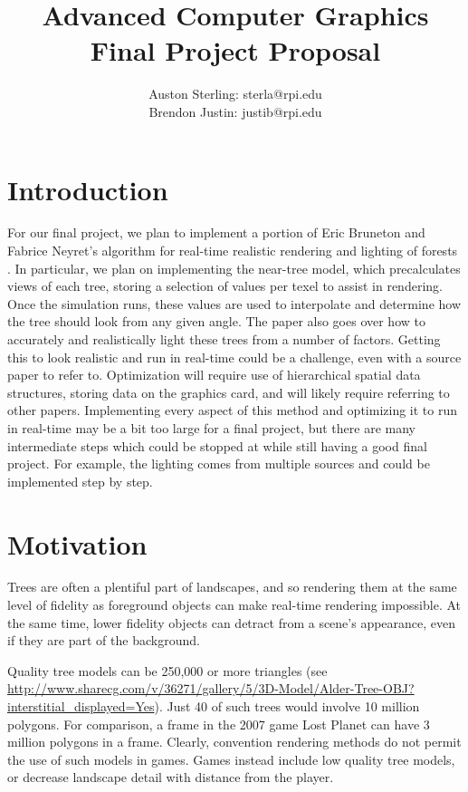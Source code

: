 \documentclass{article}
\begin{document}
\title{Advanced Computer Graphics Final Project Proposal}
\author{Auston Sterling: sterla@rpi.edu \\ Brendon Justin: justib@rpi.edu}
\date{}
\maketitle

\section{Introduction}
For our final project, we plan to implement a portion of Eric Bruneton and Fabrice Neyret's algorithm for real-time realistic rendering and lighting of forests \cite{trees}. In particular, we plan on implementing the near-tree model, which precalculates views of each tree, storing a selection of values per texel to assist in rendering. Once the simulation runs, these values are used to interpolate and determine how the tree should look from any given angle. The paper also goes over how to accurately and realistically light these trees from a number of factors. Getting this to look realistic and run in real-time could be a challenge, even with a source paper to refer to. Optimization will require use of hierarchical spatial data structures, storing data on the graphics card, and will likely require referring to other papers. Implementing every aspect of this method and optimizing it to run in real-time may be a bit too large for a final project, but there are many intermediate steps which could be stopped at while still having a good final project. For example, the lighting comes from multiple sources and could be implemented step by step.

\section{Motivation}
Trees are often a plentiful part of landscapes, and so rendering them at the same level of fidelity as foreground objects can make real-time rendering impossible.  At the same time, lower fidelity objects can detract from a scene's appearance, even if they are part of the background.  

Quality tree models can be 250,000 or more triangles \cite{???}
(see \url{http://www.sharecg.com/v/36271/gallery/5/3D-Model/Alder-Tree-OBJ?interstitial_displayed=Yes}).  Just 40 of such trees would involve 10 million polygons.  For comparison, a frame in the 2007 game Lost Planet can have 3 million polygons in a frame\cite{many_polygons}.  Clearly, convention rendering methods do not permit the use of such models in games.  Games instead include low quality tree models, or decrease landscape detail with distance from the player.
\end{document}
